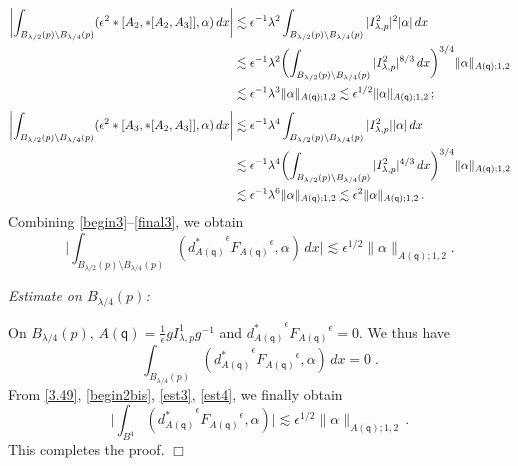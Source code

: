 \documentclass[11pt]{article}
\numberwithin{equation}{section} \setlength{\topmargin}{-35pt}
\newcommand{\q}{\mathsf{q}}
\begin{document}
\begin{align}
\biggl|\int_{B_{\lambda/2}(p)\setminus
B_{\lambda/4}(p)}(\epsilon^2\ast[A_2,\ast[A_2,A_3]],\alpha)\,dx\biggr|
&\lesssim\epsilon^{-1}\lambda^2\int_{B_{\lambda/2}(p)\setminus B_{\lambda/4}(p)}|I^2_{\lambda,p}|^2|\alpha|\,dx\notag\\
&\lesssim\epsilon^{-1}\lambda^2\biggl(\int_{B_{\lambda/2}(p)\setminus
B_{\lambda/4}(p)}|I^2_{\lambda,p}|^{8/3}\,dx\biggr)^{3/4}
\|\alpha\|_{A(\q);1,2}\notag\\
&\lesssim\epsilon^{-1}\lambda^3\|\alpha\|_{A(\q);1,2}\lesssim\epsilon^{1/2}\|\alpha\|_{A(\q);1,2}\,;
\end{align}
\begin{align}
\label{final3} \biggl|\int_{B_{\lambda/2}(p)\setminus
B_{\lambda/4}(p)}(\epsilon^2\ast[A_3,\ast[A_2,A_3]],\alpha)\,dx
\biggr|&\lesssim\epsilon^{-1}\lambda^4\int_{B_{\lambda/2}(p)\setminus B_{\lambda/4}(p)}|I^2_{\lambda,p}||\alpha|\,dx\notag\\
&\lesssim\epsilon^{-1}\lambda^4\biggl(\int_{B_{\lambda/2}(p)\setminus
B_{\lambda/4}(p)}|I^2_{\lambda,p}|^{4/3}\,dx\biggr)^{3/4}
\|\alpha\|_{A(\q);1,2}\notag\\
&\lesssim\epsilon^{-1}\lambda^6\|\alpha\|_{A(\q);1,2}\lesssim\epsilon^2\|\alpha\|_{A(\q);1,2}\,.
\end{align}
Combining \eqref{begin3}--\eqref{final3}, we obtain
\begin{equation}
\label{est3} \biggl|\int_{B_{\lambda/2}(p)\setminus
B_{\lambda/4}(p)}({d_{A(\q)}^{\ast}}^{\epsilon}{F_{A(\q)}}^{\epsilon},\alpha)\,dx
\biggr|\lesssim\epsilon^{1/2}\|\alpha\|_{A(\q);1,2}.
\end{equation}

\medskip

\textit{Estimate on $B_{\lambda/4}(p)$:}

\noindent On $B_{\lambda/4}(p)$,
$A(\q)=\frac{1}{\epsilon}gI^1_{\lambda,p}g^{-1}$ and
${d_{A(\q)}^{\ast}}^{\epsilon}{F_{A(\q)}}^{\epsilon}=0$. We thus
have
\begin{equation}
\label{est4}
\int_{B_{\lambda/4}(p)}({d_{A(\q)}^{\ast}}^{\epsilon}{F_{A(\q)}}^{\epsilon},\alpha)\,dx=0\;.
\end{equation}
From \eqref{3.49}, \eqref{begin2bis}, \eqref{est3}, \eqref{est4}, we
finally obtain
$$\biggl|\int_{B^4}({d_{A(\q)}^{\ast}}^{\epsilon}{F_{A(\q)}}^{\epsilon},\alpha) \biggr|\lesssim\epsilon^{1/2}\|\alpha\|_{A(\q);1,2}\,.$$
This completes the proof. \hfill$\Box$
\end{document}
